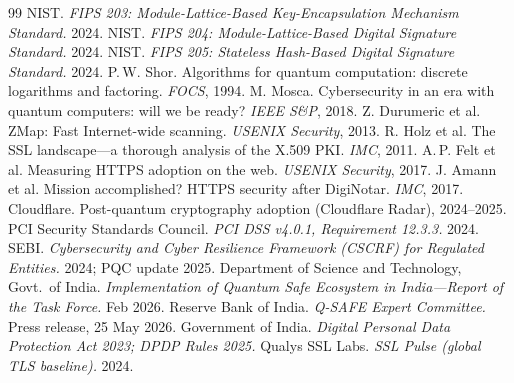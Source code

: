 \documentclass[11pt]{article}
\begin{document}
\begin{thebibliography}{99}
 NIST. \emph{FIPS 203: Module-Lattice-Based Key-Encapsulation Mechanism Standard.} 2024.
 NIST. \emph{FIPS 204: Module-Lattice-Based Digital Signature Standard.} 2024.
 NIST. \emph{FIPS 205: Stateless Hash-Based Digital Signature Standard.} 2024.
 P.\,W. Shor. Algorithms for quantum computation: discrete logarithms and factoring. \emph{FOCS}, 1994.
 M. Mosca. Cybersecurity in an era with quantum computers: will we be ready? \emph{IEEE S\&P}, 2018.
 Z. Durumeric et al. ZMap: Fast Internet-wide scanning. \emph{USENIX Security}, 2013.
 R. Holz et al. The SSL landscape---a thorough analysis of the X.509 PKI. \emph{IMC}, 2011.
 A.\,P. Felt et al. Measuring HTTPS adoption on the web. \emph{USENIX Security}, 2017.
 J. Amann et al. Mission accomplished? HTTPS security after DigiNotar. \emph{IMC}, 2017.
 Cloudflare. Post-quantum cryptography adoption (Cloudflare Radar), 2024--2025.
 PCI Security Standards Council. \emph{PCI DSS v4.0.1, Requirement 12.3.3.} 2024.
 SEBI. \emph{Cybersecurity and Cyber Resilience Framework (CSCRF) for Regulated Entities.} 2024; PQC update 2025.
 Department of Science and Technology, Govt.\ of India. \emph{Implementation of Quantum Safe Ecosystem in India---Report of the Task Force.} Feb 2026.
 Reserve Bank of India. \emph{Q-SAFE Expert Committee.} Press release, 25 May 2026.
 Government of India. \emph{Digital Personal Data Protection Act 2023; DPDP Rules 2025.}
 Qualys SSL Labs. \emph{SSL Pulse (global TLS baseline).} 2024.
\end{thebibliography}
\end{document}
